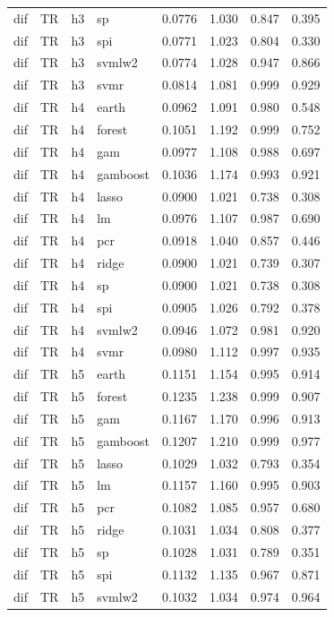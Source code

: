\begin{ThreePartTable}
\begin{longtable}[t]{llclcccc}
dif & TR & h3 & sp & 0.0776 & 1.030 & 0.847 & 0.395\\
dif & TR & h3 & spi & 0.0771 & 1.023 & 0.804 & 0.330\\
dif & TR & h3 & svmlw2 & 0.0774 & 1.028 & 0.947 & 0.866\\
dif & TR & h3 & svmr & 0.0814 & 1.081 & 0.999 & 0.929\\
\addlinespace
dif & TR & h4 & earth & 0.0962 & 1.091 & 0.980 & 0.548\\
dif & TR & h4 & forest & 0.1051 & 1.192 & 0.999 & 0.752\\
dif & TR & h4 & gam & 0.0977 & 1.108 & 0.988 & 0.697\\
dif & TR & h4 & gamboost & 0.1036 & 1.174 & 0.993 & 0.921\\
dif & TR & h4 & lasso & 0.0900 & 1.021 & 0.738 & 0.308\\
dif & TR & h4 & lm & 0.0976 & 1.107 & 0.987 & 0.690\\
dif & TR & h4 & pcr & 0.0918 & 1.040 & 0.857 & 0.446\\
dif & TR & h4 & ridge & 0.0900 & 1.021 & 0.739 & 0.307\\
dif & TR & h4 & sp & 0.0900 & 1.021 & 0.738 & 0.308\\
dif & TR & h4 & spi & 0.0905 & 1.026 & 0.792 & 0.378\\
dif & TR & h4 & svmlw2 & 0.0946 & 1.072 & 0.981 & 0.920\\
dif & TR & h4 & svmr & 0.0980 & 1.112 & 0.997 & 0.935\\
\addlinespace
dif & TR & h5 & earth & 0.1151 & 1.154 & 0.995 & 0.914\\
dif & TR & h5 & forest & 0.1235 & 1.238 & 0.999 & 0.907\\
dif & TR & h5 & gam & 0.1167 & 1.170 & 0.996 & 0.913\\
dif & TR & h5 & gamboost & 0.1207 & 1.210 & 0.999 & 0.977\\
dif & TR & h5 & lasso & 0.1029 & 1.032 & 0.793 & 0.354\\
dif & TR & h5 & lm & 0.1157 & 1.160 & 0.995 & 0.903\\
dif & TR & h5 & pcr & 0.1082 & 1.085 & 0.957 & 0.680\\
dif & TR & h5 & ridge & 0.1031 & 1.034 & 0.808 & 0.377\\
dif & TR & h5 & sp & 0.1028 & 1.031 & 0.789 & 0.351\\
dif & TR & h5 & spi & 0.1132 & 1.135 & 0.967 & 0.871\\
dif & TR & h5 & svmlw2 & 0.1032 & 1.034 & 0.974 & 0.964\\

\end{longtable}
\end{ThreePartTable}
